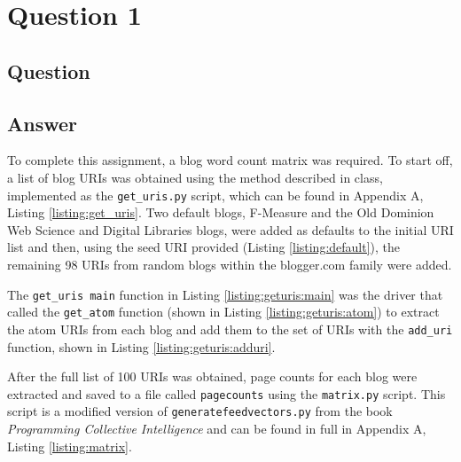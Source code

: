 \section{Question 1}

\subsection{Question}


\subsection{Answer}
To complete this assignment, a blog word count matrix was required. To start off, a list of blog URIs was obtained using the method described in class, implemented as the {\tt get\_uris.py} script, which can be found in Appendix A, Listing \ref{listing:get_uris}. Two default blogs, F-Measure and the Old Dominion Web Science and Digital Libraries blogs, were added as defaults to the initial URI list and then, using the seed URI provided (Listing \ref{listing:default}), the remaining 98 URIs from random blogs within the blogger.com family were added.
\vspace{2mm}


The {\tt get\_uris main} function in Listing \ref{listing:geturis:main} was the driver that called the {\tt get\_atom} function (shown in Listing \ref{listing:geturis:atom}) to extract the atom \cite{atom} URIs from each blog and add them to the set of URIs with the {\tt add\_uri} function, shown in Listing \ref{listing:geturis:adduri}.


\clearpage








After the full list of 100 URIs was obtained, page counts for each blog were extracted and saved to a file called {\tt pagecounts} using the {\tt matrix.py} script. This script is a modified version of {\tt generatefeedvectors.py} from the book {\it Programming Collective Intelligence} \cite{pci} and can be found in full in Appendix A, Listing \ref{listing:matrix}. 


